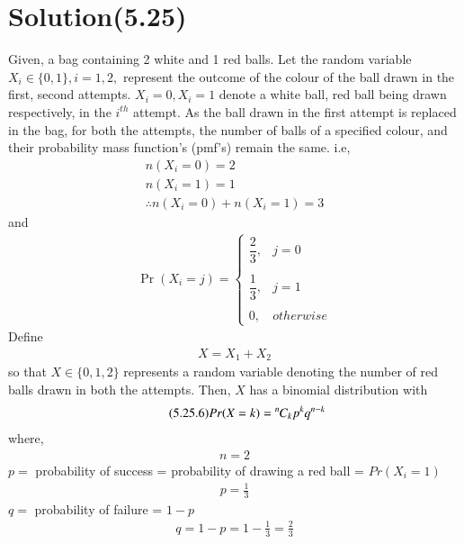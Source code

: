 \documentclass[journal,12pt,twocolumn]{IEEEtran}
\begin{document}
\section*{Solution(5.25)}
Given, a bag containing 2 white and 1 red balls. Let the random variable $X_{i}\in\{0,1\},i=1,2,$ represent the outcome of the colour of the ball drawn in the first, second attempts. $X_{i}=0,X_{i}=1$ denote a white ball, red ball being drawn respectively, in the $i^{th}$ attempt.
\newline
\newline
As the ball drawn in the first attempt is replaced in the bag, for both the attempts, the number of balls of a specified colour, and their probability  mass function's (pmf's) remain the same. i.e, 
\begin{align}
    \tag{5.25.1}
    n(X_{i}=0)=2\\
    \tag{5.25.2}
    n(X_{i}=1)=1\\
    \tag{5.25.3}
    \therefore n(X_{i}=0)+n(X_{i}=1)=3 
\end{align}
and
\begin{align}
    \tag{5.25.4}
    \Pr(X_{i}=j) = 
	\begin{cases}
	\dfrac{2}{3}, &j=0 \\~\\[-1em]
	\dfrac{1}{3}, &j=1 \\~\\[-1em]
	0, & otherwise
	\end{cases}
\end{align}
\newpage
Define 
\begin{align}
    \tag{5.25.5}
    X=X_{1}+X_{2}
\end{align}
so that $X\in\{0,1,2\}$ represents a random variable denoting the number of red balls drawn in both the attempts. Then, $X$ has a binomial distribution with 
\begin{align}
    \tag{5.25.6}
    Pr(X=k)={{{}^{n}\mkern-1muC_{k}}}p^{k}q^{n-k}
\end{align}
where,
\begin{align}
    \tag{5.25.7}
    n=2
\end{align}
\newline $p =$ probability of success = probability of drawing a red ball = $Pr(X_{i}=1)$
\begin{align}
    \tag{5.25.8}
    p=\frac{1}{3}
\end{align}
\newline $q =$ probability of failure = $1-p$
\begin{align}
    \tag{5.25.9}
    q=1-p=1-\frac{1}{3}=\frac{2}{3}
\end{align}
\end{document}
